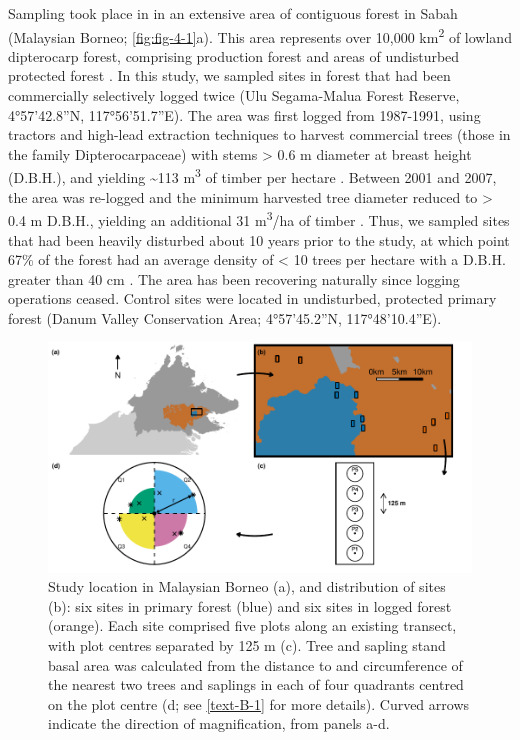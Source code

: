 \documentclass[12pt,a4paper,]{report}
\theoremstyle{definition}
\theoremstyle{definition}
\theoremstyle{definition}
\theoremstyle{remark}
\begin{document}
Sampling took place in in an extensive area of contiguous forest in
Sabah (Malaysian Borneo; \autoref{fig:fig-4-1}a). This area represents
over 10,000 km\textsuperscript{2} of lowland dipterocarp forest,
comprising production forest and areas of undisturbed protected forest
\citep{reynolds_changes_2011}. In this study, we sampled sites in forest
that had been commercially selectively logged twice (Ulu Segama-Malua
Forest Reserve, 4°57'42.8''N, 117°56'51.7''E). The area was first logged
from 1987-1991, using tractors and high-lead extraction techniques to
harvest commercial trees (those in the family Dipterocarpaceae) with
stems \textgreater{} 0.6 m diameter at breast height (D.B.H.), and
yielding \textasciitilde{}113 m\textsuperscript{3} of timber per hectare
\citep{fisher_cost-effective_2011, edwards_selective-logging_2014}.
Between 2001 and 2007, the area was re-logged and the minimum harvested
tree diameter reduced to \textgreater{} 0.4 m D.B.H., yielding an
additional 31 m\textsuperscript{3}/ha of timber
\citep{fisher_cost-effective_2011}. Thus, we sampled sites that had been
heavily disturbed about 10 years prior to the study, at which point 67\%
of the forest had an average density of \textless{} 10 trees per hectare
with a D.B.H. greater than 40 cm \citep{reynolds_changes_2011}. The area
has been recovering naturally since logging operations ceased. Control
sites were located in undisturbed, protected primary forest (Danum
Valley Conservation Area; 4°57'45.2''N, 117°48'10.4''E).

\begin{figure}

{\centering \includegraphics{./output/fig-4-1-1} 

}

\caption{Study location in Malaysian Borneo (a), and distribution of sites (b): six sites in primary forest (blue) and six sites in logged forest (orange). Each site comprised five plots along an existing transect, with plot centres separated by 125 m (c). Tree and sapling stand basal area was calculated from the distance to and circumference of the nearest two trees and saplings in each of four quadrants centred on the plot centre (d; see \autoref{text-B-1} for more details). Curved arrows indicate the direction of magnification, from panels a-d.}\label{fig:fig-4-1}
\end{figure}
\end{document}
